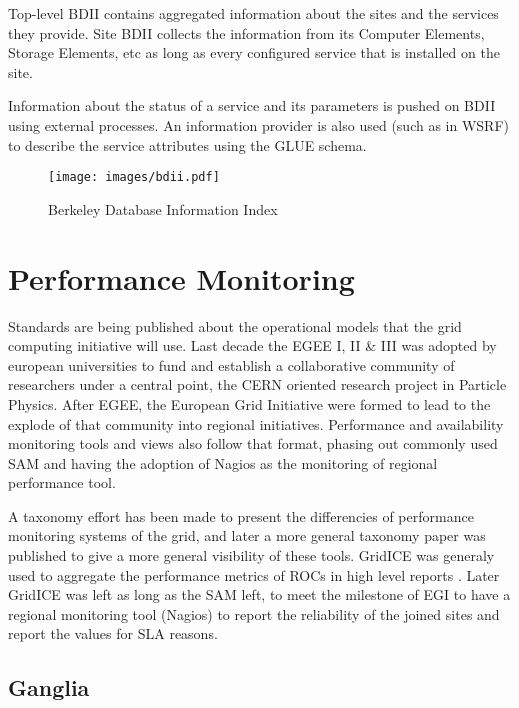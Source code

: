 Top-level BDII contains aggregated information about the sites and the services
they provide. Site BDII collects the information from its Computer Elements,
Storage Elements, etc as long as every configured service that is installed
on the site.

Information about the status of a service and its parameters is pushed on BDII
using external processes. An information provider is also used (such as in WSRF)
to describe the service attributes using the GLUE schema.

\begin{figure}[htb]
\centering
 \texttt{[image: images/bdii.pdf]}
\caption{Berkeley Database Information Index}
\label{figure:bdii}
\end{figure}

\section{Performance Monitoring}
Standards are being published about the operational models that the grid
computing initiative will use. Last decade the EGEE I, II \& III was adopted by
european universities to fund and establish a collaborative community of
researchers under a central point, the CERN oriented research project in
Particle Physics. After EGEE, the European Grid Initiative were formed to lead
to the explode of that community into regional initiatives. Performance
and availability monitoring tools and views also follow that format, phasing out
commonly used SAM \cite{egee3dsa122} and having the adoption of Nagios as the
monitoring of regional performance tool.


A taxonomy effort has been made \cite{gerndt2004performance} to present the
differencies of performance monitoring systems of the grid, and later a more
general \cite{zanikolas2007importance} taxonomy paper was published to give a
more general visibility of these tools. GridICE was generaly used to aggregate
the performance metrics of ROCs in high level reports
\cite{andreozzi2005gridice}. Later GridICE was left as long as the SAM left, to
meet the milestone of EGI to have a regional monitoring tool (Nagios) to report
the reliability of the joined sites and report the values for SLA reasons.

\subsection{Ganglia}
\newpage


